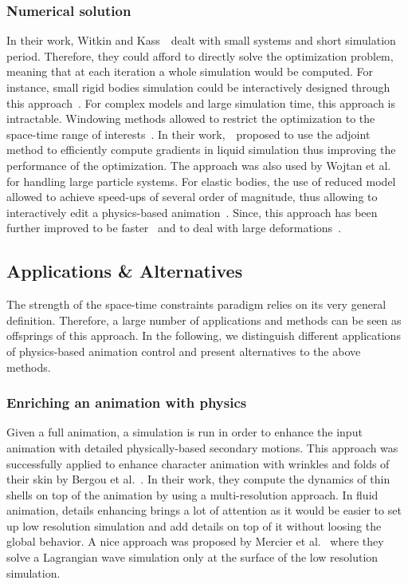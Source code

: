 \subsubsection{Numerical solution}
In their work, Witkin and Kass~\cite{Witkin1988}~dealt with small systems and short simulation period.
Therefore, they could afford to directly solve the optimization problem, meaning that at each iteration a whole simulation would be computed. For instance, small rigid bodies simulation could be interactively designed through this approach~\cite{Popovic2000,Popovic2003}. For complex models and large simulation time, this approach is intractable. Windowing methods allowed to restrict the optimization to the space-time range of interests~\cite{Cohen1992}. In their work,~\cite{McNamara2004}~proposed to use the adjoint method to efficiently compute gradients in liquid simulation thus improving the performance of the optimization. The approach was also used by Wojtan et al.~\cite{wojtan2006keyframe} for handling large particle systems. For elastic bodies, the use of reduced model allowed to achieve speed-ups of several order of magnitude, thus allowing to interactively edit a physics-based animation~\cite{Barbic2012,Hildebrandt2012,Hahn2012}. Since, this approach has been further improved to be faster~\cite{Schulz2014} and to deal with large deformations~\cite{Li2014}.

\subsection{Applications \& Alternatives}
The strength of the space-time constraints paradigm relies on its very general definition. Therefore, a large number of applications and methods can be seen as offsprings of this approach. In the following, we distinguish different applications of physics-based animation control and present alternatives to the above methods.

\subsubsection{Enriching an animation with physics}
Given a full animation, a simulation is run in order to enhance the input animation with detailed physically-based secondary motions. This approach was successfully applied to enhance character animation with wrinkles and folds of their skin by Bergou et al.~\cite{Bergou2007}. In their work, they compute the dynamics of thin shells on top of the animation by using a multi-resolution approach. In fluid animation, details enhancing brings a lot of attention as it would be easier to set up low resolution simulation and add details on top of it without loosing the global behavior. A nice approach was proposed by Mercier et al.~\cite{Mercier2015} where they solve a Lagrangian wave simulation only at the surface of the low resolution simulation.

